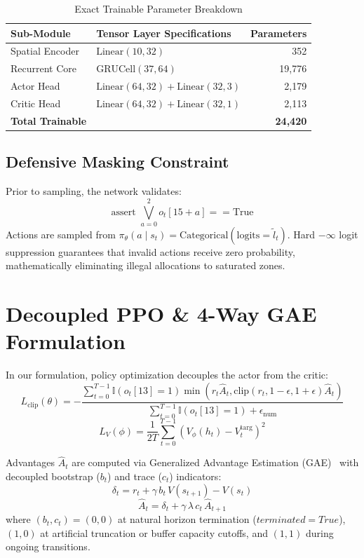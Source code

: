 \documentclass[journal]{IEEEtran}
\begin{document}
\begin{table}[t]
\caption{Exact Trainable Parameter Breakdown}
\label{tab:params}
\centering
\begin{tabular}{llr}
\toprule
\textbf{Sub-Module} & \textbf{Tensor Layer Specifications} & \textbf{Parameters} \\
\midrule
Spatial Encoder & $\text{Linear}(10, 32)$ & 352 \\
Recurrent Core & $\text{GRUCell}(37, 64)$ & 19,776 \\
Actor Head & $\text{Linear}(64, 32) + \text{Linear}(32, 3)$ & 2,179 \\
Critic Head & $\text{Linear}(64, 32) + \text{Linear}(32, 1)$ & 2,113 \\
\midrule
\textbf{Total Trainable} & & \textbf{24,420} \\
\bottomrule
\end{tabular}
\end{table}

\subsection{Defensive Masking Constraint}
Prior to sampling, the network validates:
\begin{equation}
\text{assert } \bigvee_{a=0}^2 o_t[15+a] == \text{True}
\end{equation}
Actions are sampled from $\pi_\theta(a \mid s_t) = \text{Categorical}(\text{logits}=\tilde{l}_t)$. Hard $-\infty$ logit suppression guarantees that invalid actions receive zero probability, mathematically eliminating illegal allocations to saturated zones.

\section{Decoupled PPO \& 4-Way GAE Formulation}
In our formulation, policy optimization decouples the actor from the critic:
\begin{equation}
L_{\text{clip}}(\theta) = -\frac{\sum_{t=0}^{T-1} \mathbb{I}(o_t[13]=1) \min(r_t \hat{A}_t, \text{clip}(r_t, 1-\epsilon, 1+\epsilon) \hat{A}_t)}{\sum_{t=0}^{T-1} \mathbb{I}(o_t[13]=1) + \epsilon_{\text{num}}}
\end{equation}
\begin{equation}
L_V(\phi) = \frac{1}{2 T} \sum_{t=0}^{T-1} \left( V_\phi(h_t) - V_t^{\text{targ}} \right)^2
\end{equation}

Advantages $\hat{A}_t$ are computed via Generalized Advantage Estimation (GAE)~\cite{schulman2015high} with decoupled bootstrap ($b_t$) and trace ($c_t$) indicators:
\begin{equation}
\delta_t = r_t + \gamma \, b_t \, V(s_{t+1}) - V(s_t)
\end{equation}
\begin{equation}
\hat{A}_t = \delta_t + \gamma \, \lambda \, c_t \, \hat{A}_{t+1}
\end{equation}
where $(b_t, c_t) = (0, 0)$ at natural horizon termination ($terminated=True$), $(1, 0)$ at artificial truncation or buffer capacity cutoffs, and $(1, 1)$ during ongoing transitions.
\end{document}
